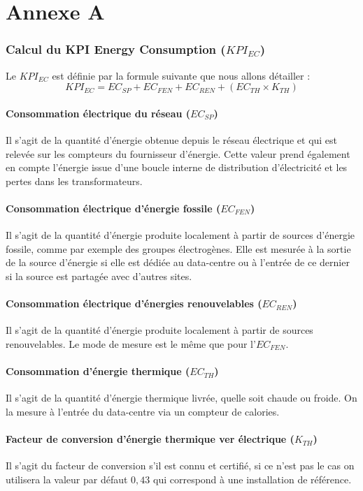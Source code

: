 \part*{Annexe A}
\section{Calcul du KPI Energy Consumption ($KPI_{EC}$)}
\label{appendix:kpiec}
Le $KPI_{EC}$ est définie par la formule suivante que nous allons détailler :
\[KPI_{EC} = EC_{SP} + EC_{FEN} + EC_{REN} + (EC_{TH} \times K_{TH})\]

\subsection{Consommation électrique du réseau ($EC_{SP}$)}
Il s'agit de la quantité d'énergie obtenue depuis le réseau électrique et qui est relevée sur les compteurs du fournisseur d'énergie.
Cette valeur prend également en compte l'énergie issue d'une boucle interne de distribution d'électricité et les pertes dans les transformateurs.

\subsection{Consommation électrique d'énergie fossile ($EC_{FEN}$)}
Il s'agit de la quantité d'énergie produite localement à partir de sources d'énergie fossile, comme par exemple des groupes électrogènes. Elle est mesurée à la sortie de la source d'énergie si elle est dédiée au data-centre ou à l'entrée de ce dernier si la source est partagée avec d'autres sites.

\subsection{Consommation électrique d'énergies renouvelables ($EC_{REN}$)}
Il s'agit de la quantité d'énergie produite localement à partir de sources renouvelables. Le mode de mesure est le même que pour l'$EC_{FEN}$.

\subsection{Consommation d'énergie thermique ($EC_{TH}$)}
Il s'agit de la quantité d'énergie thermique livrée, quelle soit chaude ou froide. On la mesure à l'entrée du data-centre via un compteur de calories.

\subsection{Facteur de conversion d'énergie thermique ver électrique ($K_{TH}$)}
Il s'agit du facteur de conversion s'il est connu et certifié, si ce n'est pas le cas on utilisera la valeur par défaut $0,43$ qui correspond à une installation de référence.
\newpage